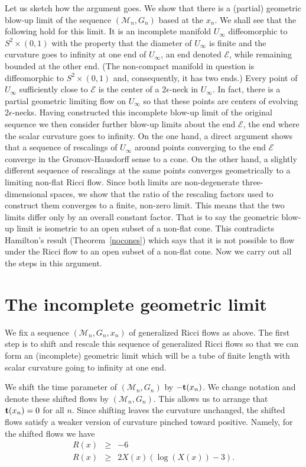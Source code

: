Let us sketch how the argument goes. We show that there is a
(partial) geometric blow-up limit of the sequence $({\mathcal
M}_n,G_n)$ based at the $x_n$. We shall see that the following hold
for this limit. It is an incomplete manifold $U_\infty$
diffeomorphic to $S^2\times (0,1)$ with the property that the
diameter of $U_\infty$ is finite and the curvature goes to infinity
at one end of $U_\infty$, an end denoted ${\mathcal E}$, while
remaining bounded at the other end. (The non-compact manifold in
question is diffeomorphic to $S^2\times (0,1)$ and, consequently, it
has two ends.)
 Every point of $U_\infty$
sufficiently close to ${\mathcal E}$ is the center of a
$2\epsilon$-neck in $U_\infty$. In fact, there is a partial
geometric limiting flow on $U_\infty$ so that these points are
centers of evolving $2\epsilon$-necks. Having constructed this
incomplete blow-up limit of the original sequence we then consider
further blow-up limits about the end ${\mathcal E}$, the end where
the scalar curvature goes to infinity. On the one hand, a direct
argument shows that a sequence of rescalings of $U_\infty$ around
points converging to the end ${\mathcal E}$ converge in the
Gromov-Hausdorff sense to a cone. On the other hand, a slightly
different sequence of rescalings at the same points converges
geometrically to a limiting non-flat Ricci flow. Since both limits
are non-degenerate three-dimensional spaces, we show that the ratio
of the rescaling factors used to construct them converges to a
finite, non-zero limit. This means that the two limits differ only
by an overall constant factor. That is to say the geometric blow-up
limit is isometric to an open subset of a non-flat cone. This
contradicts Hamilton's result (Theorem~\ref{nocones}) which says
that it is not possible to flow under the Ricci flow to an open
subset of a non-flat cone. Now we carry out all the steps in this
argument.

\section{The incomplete geometric limit}\label{sectincomp}

We fix a sequence $({\mathcal M}_n,G_n,x_n)$ of generalized Ricci
flows as above. The first step  is to shift and rescale this
sequence of generalized Ricci flows so that we can form an
(incomplete) geometric limit which will be a tube of finite length
with scalar curvature going to infinity at one end.

We shift the time parameter of $({\mathcal M}_n,G_n)$ by $-{\bf
t}(x_n)$. We change notation and denote these shifted flows by
$({\mathcal M}_n,G_n)$. This allows us to arrange that ${\bf
t}(x_n)=0$ for all $n$. Since shifting leaves the curvature
unchanged, the shifted flows  satisfy a weaker version of curvature
pinched toward positive. Namely, for the shifted flows we have
\begin{eqnarray}\label{weakerpos}
R(x) & \ge & -6 \nonumber \\
R(x) & \ge & 2X(x)\left(\log(X(x))-3\right).
\end{eqnarray}

